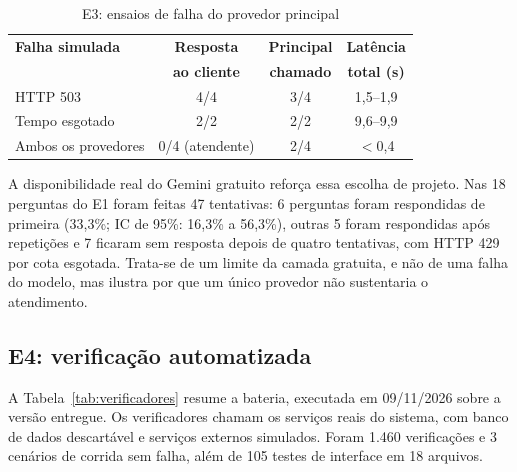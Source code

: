 \documentclass[conference]{IEEEtran}
\begin{document}
\begin{table}[t]
\caption{E3: ensaios de falha do provedor principal}
\label{tab:contingencia}
\centering
\footnotesize
\setlength{\tabcolsep}{4pt}
\begin{tabular}{@{}L{2.1cm}ccc@{}}
\toprule
\textbf{Falha simulada} & \textbf{Resposta} & \textbf{Principal} & \textbf{Latência} \\
 & \textbf{ao cliente} & \textbf{chamado} & \textbf{total (s)} \\
\midrule
HTTP 503 & 4/4 & 3/4 & 1,5--1,9 \\
Tempo esgotado & 2/2 & 2/2 & 9,6--9,9 \\
Ambos os provedores & 0/4 (atendente) & 2/4 & $<$0,4 \\
\bottomrule
\end{tabular}
\end{table}

A disponibilidade real do Gemini gratuito reforça essa escolha de projeto. Nas 18 perguntas do E1 foram feitas 47 tentativas: 6 perguntas foram respondidas de primeira (33,3\%; IC de 95\%: 16,3\% a 56,3\%), outras 5 foram respondidas após repetições e 7 ficaram sem resposta depois de quatro tentativas, com HTTP 429 por cota esgotada. Trata-se de um limite da camada gratuita, e não de uma falha do modelo, mas ilustra por que um único provedor não sustentaria o atendimento.

\subsection{E4: verificação automatizada}

A Tabela~\ref{tab:verificadores} resume a bateria, executada em 09/11/2026 sobre a versão entregue. Os verificadores chamam os serviços reais do sistema, com banco de dados descartável e serviços externos simulados. Foram 1.460 verificações e 3 cenários de corrida sem falha, além de 105 testes de interface em 18 arquivos.
\end{document}
